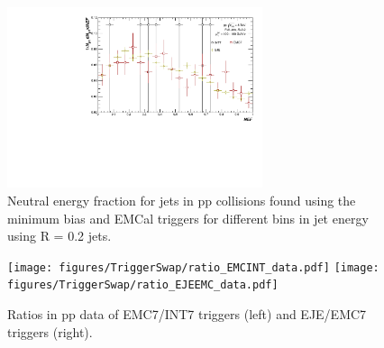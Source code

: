 \documentclass[ALICE]{ALICE_analysis_notes}
\newcommand{\pp}{pp\xspace}
\begin{document}
\begin{figure}[h!]
\begin{multicols}{2}
            \includegraphics[width=7.5cm]{figures/NEF/All/hNEF_100-160GeV_R02.pdf}
        \vfill\null
    \end{multicols}
    \caption{Neutral energy fraction for jets in \pp collisions found using the minimum bias and EMCal triggers for different bins in jet energy using R = 0.2 jets.}
    \label{fig:NEF}
\end{figure}

\begin{figure}[h!]
    \centering
    \begin{multicols}{2}
            \texttt{[image: figures/TriggerSwap/ratio\_EMCINT\_data.pdf]}
        \vfill\null 
        \columnbreak
            \texttt{[image: figures/TriggerSwap/ratio\_EJEEMC\_data.pdf]}
        \vfill\null
    \end{multicols}
    \caption{Ratios in \pp data of EMC7/INT7 triggers (left) and EJE/EMC7 triggers (right).}
    \label{fig:trigger_ratios}
\end{figure}
\end{document}
